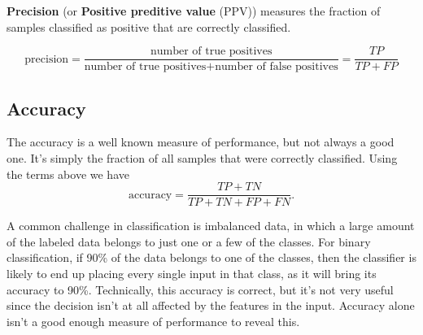 \noindent \textbf{Precision} (or \textbf{Positive preditive value} (PPV)) measures the fraction
of samples classified as positive that are correctly classified.

$$\text{precision} = \frac{\text{number of true positives}}{\text{number of true positives} + \text{number of false positives}} = \frac{TP}{TP + FP}$$

\subsection{Accuracy}
The accuracy is a well known measure of performance, but not always a good one. 
It's simply the fraction of all samples that were correctly classified. Using the 
terms above we have
$$\text{accuracy} = \frac{TP + TN}{TP + TN + FP + FN}.$$

\noindent A common challenge in classification is imbalanced data, in which a large
amount of the labeled data belongs to just one or a few of the classes.
For binary classification, if 90\% of the data belongs to one of the classes,
then the classifier is likely to end up placing every single
input in that class, as it will bring its accuracy to 90\%. Technically, this
accuracy is correct, but it's not very useful since the decision isn't at all
affected by the features in the input. Accuracy alone isn't a good enough
measure of performance to reveal this.

